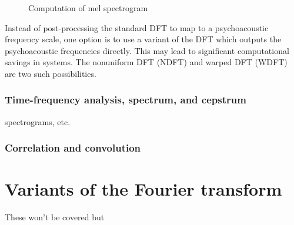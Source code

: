 \documentclass[letter,12pt,notitlepage]{article}
\begin{document}
\begin{figure}[ht]
	\centering
	\caption{Computation of mel spectrogram}
	\label{fig:melfilter}
\end{figure}

Instead of post-processing the standard DFT to map to a psychoacoustic frequency scale, one option is to use a variant of the DFT which outputs the psychoacoustic frequencies directly. This may lead to significant computational savings in systems. The nonuniform DFT (NDFT) and warped DFT (WDFT) are two such possibilities.


\subsubsection{Time-frequency analysis, spectrum, and cepstrum}

spectrograms, etc.

\subsubsection{Correlation and convolution}

\vfill
\clearpage

\section{Variants of the Fourier transform}
\label{sec:theoryvariant}

These won't be covered but

\end{document}
